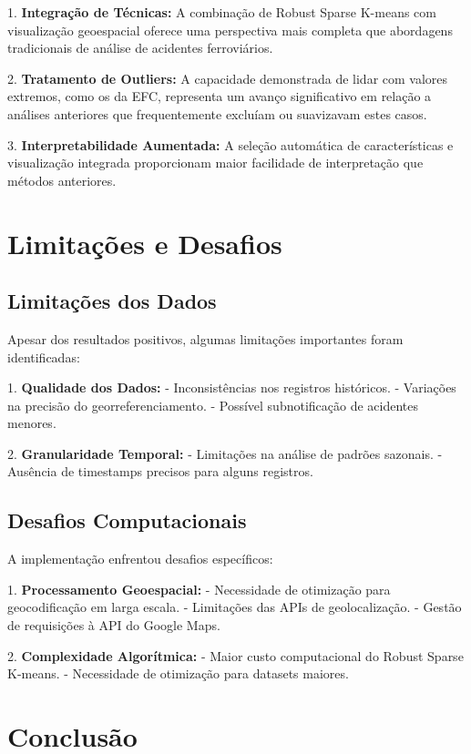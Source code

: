 \documentclass[conference]{IEEEtran}
\begin{document}
1. \textbf{Integração de Técnicas:} A combinação de Robust Sparse K-means com visualização geoespacial oferece uma perspectiva mais completa que abordagens tradicionais de análise de acidentes ferroviários.

2. \textbf{Tratamento de Outliers:} A capacidade demonstrada de lidar com valores extremos, como os da EFC, representa um avanço significativo em relação a análises anteriores que frequentemente excluíam ou suavizavam estes casos.

3. \textbf{Interpretabilidade Aumentada:} A seleção automática de características e visualização integrada proporcionam maior facilidade de interpretação que métodos anteriores.

\section{Limitações e Desafios}

\subsection{Limitações dos Dados}
Apesar dos resultados positivos, algumas limitações importantes foram identificadas:

1. \textbf{Qualidade dos Dados:}
   - Inconsistências nos registros históricos.
   - Variações na precisão do georreferenciamento.
   - Possível subnotificação de acidentes menores.

2. \textbf{Granularidade Temporal:}
   - Limitações na análise de padrões sazonais.
   - Ausência de timestamps precisos para alguns registros.

\subsection{Desafios Computacionais}
A implementação enfrentou desafios específicos:

1. \textbf{Processamento Geoespacial:}
   - Necessidade de otimização para geocodificação em larga escala.
   - Limitações das APIs de geolocalização.
   - Gestão de requisições à API do Google Maps.

2. \textbf{Complexidade Algorítmica:}
   - Maior custo computacional do Robust Sparse K-means.
   - Necessidade de otimização para datasets maiores.

\section{Conclusão}
\end{document}
